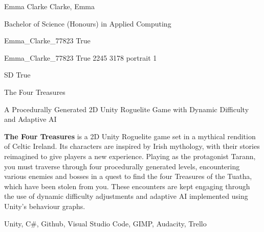 \documentclass[twoside]{report}
\begin{document}
\begingroup{}\relax



\def\Key{Emma_Clarke_77823}

{Emma Clarke}
{Clarke, Emma}

{Bachelor of Science (Honours) in Applied Computing}

{Emma_Clarke_77823}
{True}

{Emma_Clarke_77823}
{True}
{2245}
{3178}
{portrait}
{1}

{SD}
{True}

{The Four Treasures}

{A Procedurally Generated 2D Unity Roguelite Game with Dynamic Difficulty and Adaptive AI}

{{\bfseries The Four Treasures} is a 2D Unity Roguelite game set in a mythical rendition of Celtic Ireland. Its characters are inspired by Irish mythology, with their stories reimagined to give players a new experience. 
Playing as the protagonist Tarann, you must traverse through four procedurally generated levels, encountering various enemies and bosses in a quest to find the four Treasures of the Tuatha, which have been stolen from you. These encounters are kept engaging through the use of dynamic difficulty adjustments and adaptive AI implemented using Unity's behaviour graphs.}

{Unity, C\#, Github, Visual Studio Code, GIMP, Audacity, Trello}
\end{document}
